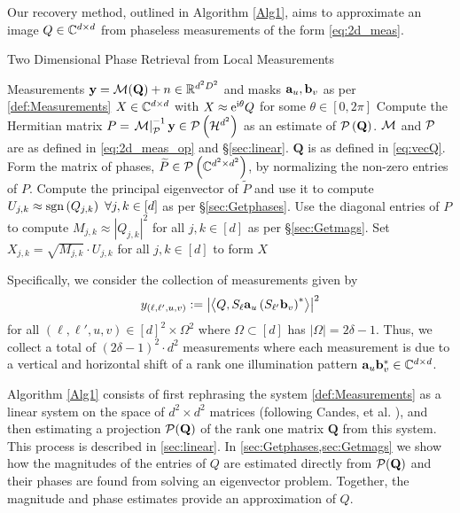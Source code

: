 Our recovery method, outlined in Algorithm \ref{Alg1}, aims to approximate an image $Q\in \mathbb{C}^{d\times d}$ from phaseless measurements of the form \eqref{eq:2d_meas}.
%
%
\begin{algorithm}[htbp]
\renewcommand{\algorithmicrequire}{\textbf{Input:}}
\renewcommand{\algorithmicensure}{\textbf{Output:}}
\caption{Two Dimensional Phase Retrieval from Local Measurements}
\label{Alg1}
\label{alg:2d_pr}
\begin{algorithmic}[1]
    \REQUIRE Measurements $\mathbf y = \mathcal{M}(\mathbf{Q}) + n \in \mathbb{R}^{d^2 D^2}$ and masks $\mathbf a_u, \mathbf b_v$ as per \eqref{def:Measurements}
    \ENSURE $X \in \mathbb{C}^{d \times d}$ with $X \approx \mathrm{e}^{\mathrm{i} \theta} Q$ for some $\theta \in [0, 2 \pi]$ 
    \STATE Compute the Hermitian matrix $P = \left.\mathcal{M}\right|_{\mathcal{P}}^{-1} {\bf y} \in \mathcal{P}\left(\mathcal{H}^{d^2}\right)$ as an estimate of $\mathcal{P} \left( \mathbf{Q} \right)$.  $\mathcal{M}$ and $\mathcal{P}$ are as defined in \eqref{eq:2d_meas_op} and \S\ref{sec:linear}.  $\mathbf{Q}$ is as defined in \eqref{eq:vecQ}.
    \STATE Form the matrix of phases, $\widetilde{P} \in \mathcal{P}\left(\mathbb{C}^{d^2\times d^2}\right)$, by normalizing the non-zero entries of $P$.
    \STATE Compute the principal eigenvector of $\widetilde{P}$ and use it to compute $U_{j,k} \approx \operatorname{sgn}\left( Q_{j,k}\right) ~\forall j,k \in [d]$ as per \S\ref{sec:Getphases}.
    \STATE Use the diagonal entries of $P$ to compute $M_{j,k} \approx \left| Q_{j,k} \right|^2$ for all $j,k \in [d]$ as per \S\ref{sec:Getmags}.
    \STATE Set $X_{j,k} = \sqrt{M_{j,k}} \cdot U_{j,k}$ for all $j,k \in [d]$ to form $X$
    \end{algorithmic}
\end{algorithm}
%
%
%
Specifically, we consider the collection of measurements given by 
\begin{equation}
y_{(\ell,\ell',u,v)} := \left| \left\langle Q, S_{\ell} \mathbf a_u \left(S_{\ell'} \mathbf b_v \right)^* \right\rangle \right|^2
\label{def:Measurements}
\end{equation}
for all $(\ell,\ell',u,v) \in [d]^2 \times\Omega^2$ where $\Omega \subset [d]$ has $|\Omega| = 2\delta-1$.  Thus, we collect a total of $(2\delta-1)^2 \cdot d^2 $ measurements where each measurement is due to a vertical and horizontal shift of a rank one illumination pattern $\mathbf a_u \mathbf b_v^* \in \mathbb{C}^{d \times d}$.

Algorithm \ref{Alg1} consists of first rephrasing the system \eqref{def:Measurements} as a linear system on the space of $d^2 \times d^2$ matrices (following Candes, et al. \cite{candes2011phaselift}), and then estimating a projection $\mathcal{P}( \mathbf{Q})$ of the rank one matrix $\mathbf{Q}$ from this system.  This process is described in \cref{sec:linear}.  In \cref{sec:Getphases,sec:Getmags} we show how the magnitudes of the entries of $Q$ are estimated directly from $\mathcal{P}(\mathbf{Q})$ and their phases are found from solving an eigenvector problem.  Together, the magnitude and phase estimates provide an approximation of $Q$.

